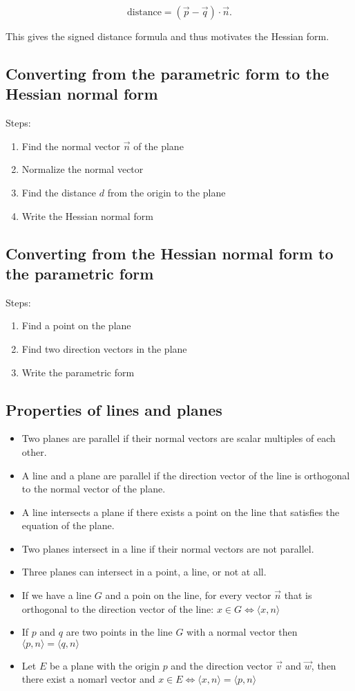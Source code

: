 \[
	\text{distance} = (\vec{p} - \vec{q}) \cdot \vec{n}.
\]

This gives the signed distance formula and thus motivates the Hessian form.

\subsection{Converting from the parametric form to the Hessian normal form}
Steps:

\begin{enumerate}[label=(\roman*)]
	\item Find the normal vector $\vec{n}$ of the plane
	\item Normalize the normal vector
	\item Find the distance $d$ from the origin to the plane
	\item Write the Hessian normal form
\end{enumerate}

\subsection{Converting from the Hessian normal form to the parametric form}
Steps:
\begin{enumerate}[label=(\roman*)]
	\item Find a point on the plane
	\item Find two direction vectors in the plane
	\item Write the parametric form
\end{enumerate}

\subsection{Properties of lines and planes}
\begin{itemize}
	\item Two planes are parallel if their normal vectors are scalar multiples of each other.
	\item A line and a plane are parallel if the direction vector of the line is orthogonal to the normal vector of the plane.
	\item A line intersects a plane if there exists a point on the line that satisfies the equation of the plane.
	\item Two planes intersect in a line if their normal vectors are not parallel.
	\item Three planes can intersect in a point, a line, or not at all.
	\item If we have a line $G$ and a poin on the line, for every vector $\vec{n}$ that is orthogonal to the
	      direction vector of the line: $x \in G \iff \langle x, n \rangle$
	\item If $p$ and $q$ are two points in the line $G$ with a normal vector then $\langle p, n\rangle = \langle q, n\rangle$
	\item Let $E$ be a plane with the origin $p$ and the direction vector $\vec{v}$ and $\vec{w}$, then there exist a nomarl vector and
	      $x \in E \iff \langle x, n\rangle = \langle p, n \rangle$
\end{itemize}

